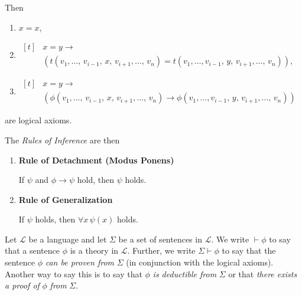 \documentclass[../../main.tex]{subfiles}
\begin{document}
\begin{definition}
\begin{enumerate}
        Then 
        \begin{enumerate}
            \item $x = x$,
            \item $\begin{aligned}[t]
                & x = y \rightarrow \\
                & \left(t(v_1,\ldots,\, v_{i-1},\, x,\, v_{i+1},\ldots,\, v_n) = t(v_1,\ldots,v_{i-1},\, y,\, v_{i+1},\ldots,\, v_n)\right),
            \end{aligned}$
            \item $\begin{aligned}[t]
                & x = y \rightarrow \\
                & \left(\phi(v_1,\ldots,\, v_{i-1},\, x,\, v_{i+1},\ldots,\, v_n) \rightarrow \phi(v_1,\ldots,v_{i-1},\, y,\, v_{i+1},\ldots,\, v_n)\right)
            \end{aligned}$
        \end{enumerate}
        are logical axioms.
    \end{enumerate}
    The \textit{Rules of Inference} are then
    \begin{enumerate}[resume]
        \item\label{detachment-rule} \textbf{Rule of Detachment (Modus Ponens)}
        
        If $\psi$ and $\phi \rightarrow \psi$ hold, then $\psi$ holds.
        \item\label{generalization-rule} \textbf{Rule of Generalization}
        
        If $\psi$ holds, then $\forall x\, \psi(x)$ holds.
    \end{enumerate}
\end{definition}

\begin{definition}[Proof]\label{proof-def}\cite[p.25]{Cha90}
    Let $\mathcal{L}$ be a language and let $\Sigma$ be a set of sentences in $\mathcal{L}$.
    We write $\vdash \phi$ to say that a sentence $\phi$ is a theory in $\mathcal{L}$.
    Further, we write $\Sigma \vdash \phi$ to say that the sentence $\phi$ \textit{can be proven from} $\Sigma$ (in conjunction with the logical axioms).
    Another way to say this is to say that $\phi$ \textit{is deductible from} $\Sigma$ or that \textit{there exists a proof of} $\phi$ \textit{from} $\Sigma$.
\end{definition}
\end{document}
